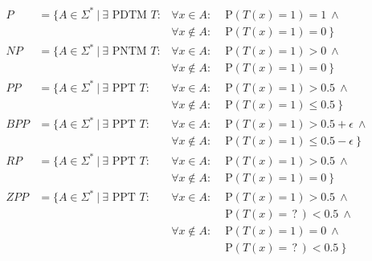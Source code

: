 \documentclass[
    13pt,
    oneside,
    a4paper,
    numbers=enddot,
    abstractoff,
    parskip=full
]{scrreprt}
\begin{document}
\begin{align*}
    P & = \{
    A \in \Sigma^\ast ~|~
    \exists \text{ PDTM } T:
    & \forall x \in A:      & \text{ P}(T(x)=1) = 1 ~\land \\
    & & \forall x \notin A: & \text{ P}(T(x)=1) = 0 ~\}
    \\
    NP & = \{
    A \in \Sigma^\ast ~|~
    \exists \text{ PNTM } T:
    & \forall x \in A:      & \text{ P}(T(x)=1) > 0 ~\land \\
    & & \forall x \notin A: & \text{ P}(T(x)=1) = 0 ~\}
    \\
    PP & = \{
    A \in \Sigma^\ast ~|~
    \exists \text{ PPT } T:
    & \forall x \in A:      & \text{ P}(T(x)=1) > 0.5 ~\land \\
    & & \forall x \notin A: & \text{ P}(T(x)=1) \leq 0.5 ~\}
    \\
    BPP & = \{
    A \in \Sigma^\ast ~|~
    \exists \text{ PPT } T:
    & \forall x \in A:      & \text{ P}(T(x)=1) > 0.5 + \epsilon ~\land \\
    & & \forall x \notin A: & \text{ P}(T(x)=1) \leq 0.5 - \epsilon ~\}
    \\
    RP & = \{
    A \in \Sigma^\ast ~|~
    \exists \text{ PPT } T:
    & \forall x \in A:      & \text{ P}(T(x)=1) > 0.5 ~\land \\
    & & \forall x \notin A: & \text{ P}(T(x)=1) = 0 ~\}
    \\
    ZPP & = \{
    A \in \Sigma^\ast ~|~
    \exists \text{ PPT } T:
    & \forall x \in A:      & \text{ P}(T(x)=1) > 0.5 ~\land \\
    & &                     & \text{ P}(T(x)=\,?\,) < 0.5 ~\land \\
    & & \forall x \notin A: & \text{ P}(T(x)=1) = 0 ~\land \\
    & &                     & \text{ P}(T(x)=\,?\,) < 0.5 ~\}
\end{align*}
\end{document}
